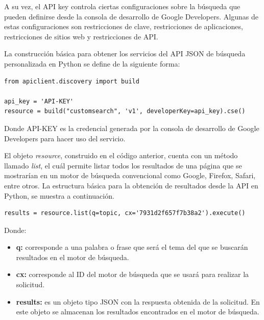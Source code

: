 A su vez, el API key controla ciertas configuraciones sobre la búsqueda que pueden definirse desde la consola de desarrollo de Google Developers. Algunas de estas configuraciones son restricciones de clave, restricciones de aplicaciones, restricciones de sitios web y restricciones de API.

La construcción básica para obtener los servicios del API JSON de búsqueda personalizada en Python se define de la siguiente forma:

\begin{tcolorbox}[colback=white!25!white,colframe=blue]
  \begin{verbatim}
from apiclient.discovery import build

api_key = 'API-KEY'
resource = build("customsearch", 'v1', developerKey=api_key).cse()
  \end{verbatim}
\end{tcolorbox}

Donde API-KEY es la credencial generada por la consola de desarrollo de Google Developers para hacer uso del servicio.

El objeto \textit{resource}, construido en el código anterior, cuenta con un método llamado \textit{list}, el cuál permite listar todos los resultados de una página que se mostrarían en un motor de búsqueda convencional como Google, Firefox, Safari, entre otros. La estructura básica para la obtención de resultados desde la API en Python, se muestra a continuación.

\begin{tcolorbox}[colback=white!25!white,colframe=blue]
  \begin{verbatim}
results = resource.list(q=topic, cx='7931d2f657f7b38a2').execute()
  \end{verbatim}
\end{tcolorbox}

Donde:

\begin{itemize}
  \item \textbf{q:} corresponde a una palabra o frase que será el tema del que se buscarán resultados en el motor de búsqueda.
  \item \textbf{cx:} corresponde al ID del motor de búsqueda que se usará para realizar la solicitud.
  \item \textbf{results:} es un objeto tipo JSON con la respuesta obtenida de la solicitud. En este objeto se almacenan los resultados encontrados en el motor de búsqueda.
\end{itemize}

